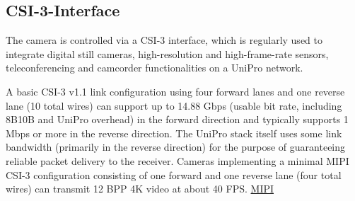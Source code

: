 \bigskip

\subsection{CSI-3-Interface}


The camera is controlled via a CSI-3 interface, which is regularly used to integrate digital still cameras, high-resolution and high-frame-rate sensors, teleconferencing and camcorder functionalities on a UniPro network. 

A basic CSI-3 v1.1 link configuration using four forward lanes and one reverse lane (10 total wires) can support up to 14.88 Gbps (usable bit rate, including 8B10B and UniPro overhead) in the forward direction and typically supports 1 Mbps or more in the reverse direction. The UniPro stack itself uses some link bandwidth (primarily in the reverse direction) for the purpose of guaranteeing reliable packet delivery to the receiver. Cameras implementing a minimal MIPI CSI-3 configuration consisting of one forward and one reverse lane (four total wires) can transmit 12 BPP 4K video at about 40 FPS. \href{https://www.mipi.org/specifications/csi-3}{\color{blue}MIPI}







